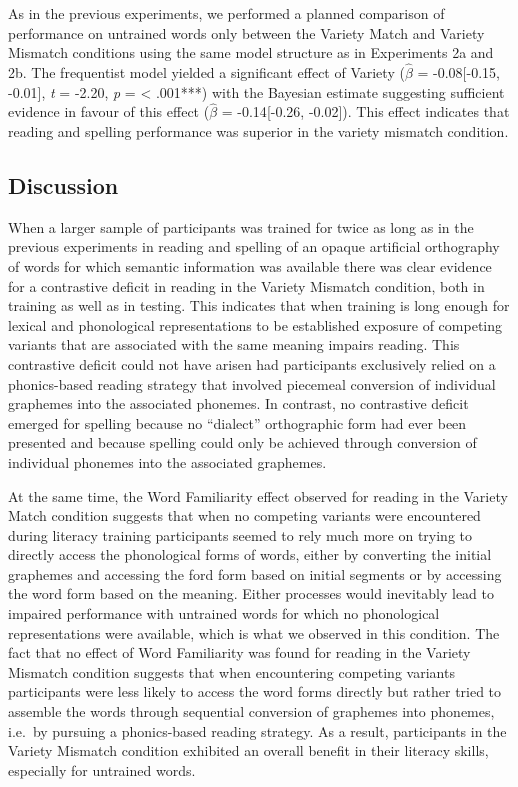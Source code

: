 \documentclass[doc,floatsintext]{apa6}
\begin{document}
As in the previous experiments, we performed a planned comparison of
performance on untrained words only between the Variety Match and
Variety Mismatch conditions using the same model structure as in
Experiments 2a and 2b. The frequentist model yielded a significant
effect of Variety (\(\hat{\beta}\) = -0.08{[}-0.15, -0.01{]}, \emph{t} =
-2.20, \emph{p} = \textless{} .001***) with the Bayesian estimate
suggesting sufficient evidence in favour of this effect (\(\hat{\beta}\)
= -0.14{[}-0.26, -0.02{]}). This effect indicates that reading and
spelling performance was superior in the variety mismatch condition.

\subsection{Discussion}\label{discussion-3}

When a larger sample of participants was trained for twice as long as in
the previous experiments in reading and spelling of an opaque artificial
orthography of words for which semantic information was available there
was clear evidence for a contrastive deficit in reading in the Variety
Mismatch condition, both in training as well as in testing. This
indicates that when training is long enough for lexical and phonological
representations to be established exposure of competing variants that
are associated with the same meaning impairs reading. This contrastive
deficit could not have arisen had participants exclusively relied on a
phonics-based reading strategy that involved piecemeal conversion of
individual graphemes into the associated phonemes. In contrast, no
contrastive deficit emerged for spelling because no \enquote{dialect}
orthographic form had ever been presented and because spelling could
only be achieved through conversion of individual phonemes into the
associated graphemes.

At the same time, the Word Familiarity effect observed for reading in
the Variety Match condition suggests that when no competing variants
were encountered during literacy training participants seemed to rely
much more on trying to directly access the phonological forms of words,
either by converting the initial graphemes and accessing the ford form
based on initial segments or by accessing the word form based on the
meaning. Either processes would inevitably lead to impaired performance
with untrained words for which no phonological representations were
available, which is what we observed in this condition. The fact that no
effect of Word Familiarity was found for reading in the Variety Mismatch
condition suggests that when encountering competing variants
participants were less likely to access the word forms directly but
rather tried to assemble the words through sequential conversion of
graphemes into phonemes, i.e.~by pursuing a phonics-based reading
strategy. As a result, participants in the Variety Mismatch condition
exhibited an overall benefit in their literacy skills, especially for
untrained words.
\end{document}
